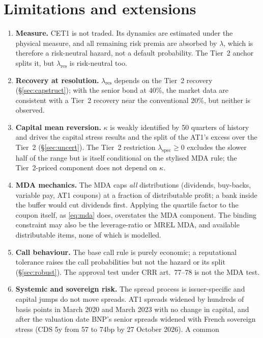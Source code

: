\documentclass[11pt]{article}
\newcommand{\1}{\mathbf{1}}
\begin{document}
\section{Limitations and extensions}
\begin{enumerate}
  \item \textbf{Measure.} CET1 is not traded. Its dynamics are estimated under
  the physical measure, and all remaining risk premia are absorbed by $\lambda$,
  which is therefore a risk-neutral hazard, not a default probability. The
  Tier~2 anchor splits it, but $\lambda_{\mathrm{res}}$ is risk-neutral too.
  \item \textbf{Recovery at resolution.} $\lambda_{\mathrm{res}}$ depends on the
  Tier~2 recovery (\S\ref{sec:capstruct}); with the senior bond at $40\%$, the
  market data are consistent with a Tier~2 recovery near the conventional $20\%$,
  but neither is observed.
  \item \textbf{Capital mean reversion.} $\kappa$ is weakly identified by 50
  quarters of history and drives the capital stress results and the split of the
  AT1's excess over the Tier~2 (\S\ref{sec:uncert}). The Tier~2 restriction
  $\lambda_{\mathrm{spec}}\ge0$ excludes the slower half of the range but is itself
  conditional on the stylised MDA rule; the Tier~2-priced component does not depend
  on $\kappa$.
  \item \textbf{MDA mechanics.} The MDA caps \emph{all} distributions (dividends,
  buy-backs, variable pay, AT1 coupons) at a fraction of distributable profit;
  a bank inside the buffer would cut dividends first. Applying the quartile
  factor to the coupon itself, as \eqref{eq:mda} does, overstates the MDA
  component. The binding constraint may also be the leverage-ratio or MREL MDA,
  and available distributable items, none of which is modelled.
  \item \textbf{Call behaviour.} The base call rule is purely economic; a
  reputational tolerance raises the call probabilities but not the hazard or its
  split (\S\ref{sec:robust}). The approval test under CRR art.~77--78 is not the
  MDA test.
  \item \textbf{Systemic and sovereign risk.} The spread process is
  issuer-specific and capital jumps do not move spreads. AT1 spreads widened by
  hundreds of basis points in March 2020 and March 2023 with no change in
  capital, and after the valuation date BNP's senior spreads widened with French
  sovereign stress (CDS 5y from 57 to 74bp by 27 October 2026). A common

\end{enumerate}
\end{document}
